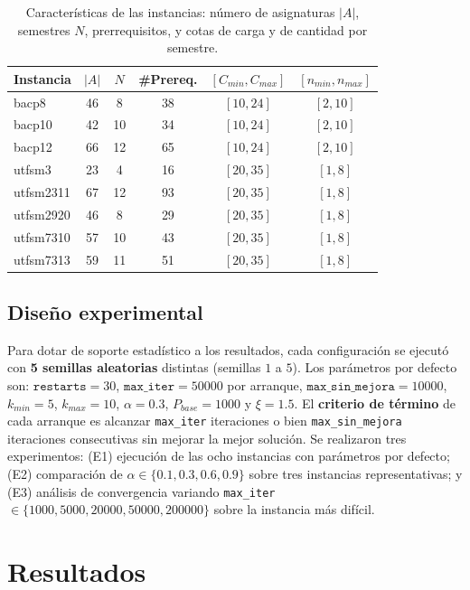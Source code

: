 \documentclass[letter, 10pt]{article}
\begin{document}
\begin{table}[h]
\centering
\begin{tabular}{lccccc}
\hline
Instancia & $|A|$ & $N$ & \#Prereq. & $[C_{min},C_{max}]$ & $[n_{min},n_{max}]$ \\
\hline
bacp8     & 46 & 8  & 38 & $[10,24]$ & $[2,10]$ \\
bacp10    & 42 & 10 & 34 & $[10,24]$ & $[2,10]$ \\
bacp12    & 66 & 12 & 65 & $[10,24]$ & $[2,10]$ \\
utfsm3    & 23 & 4  & 16 & $[20,35]$ & $[1,8]$  \\
utfsm2311 & 67 & 12 & 93 & $[20,35]$ & $[1,8]$  \\
utfsm2920 & 46 & 8  & 29 & $[20,35]$ & $[1,8]$  \\
utfsm7310 & 57 & 10 & 43 & $[20,35]$ & $[1,8]$  \\
utfsm7313 & 59 & 11 & 51 & $[20,35]$ & $[1,8]$  \\
\hline
\end{tabular}
\caption{Caracter\'isticas de las instancias: n\'umero de asignaturas $|A|$, semestres $N$, prerrequisitos, y cotas de carga y de cantidad por semestre.}
\label{tab:inst}
\end{table}

\subsection{Dise\~no experimental}
Para dotar de soporte estad\'istico a los resultados, cada configuraci\'on se ejecut\'o con \textbf{5 semillas aleatorias} distintas (semillas $1$ a $5$). Los par\'ametros por defecto son: $\texttt{restarts}=30$, $\texttt{max\_iter}=50000$ por arranque, $\texttt{max\_sin\_mejora}=10000$, $k_{min}=5$, $k_{max}=10$, $\alpha=0.3$, $P_{base}=1000$ y $\xi=1.5$. El \textbf{criterio de t\'ermino} de cada arranque es alcanzar \texttt{max\_iter} iteraciones o bien \texttt{max\_sin\_mejora} iteraciones consecutivas sin mejorar la mejor soluci\'on. Se realizaron tres experimentos: (E1) ejecuci\'on de las ocho instancias con par\'ametros por defecto; (E2) comparaci\'on de $\alpha \in \{0.1, 0.3, 0.6, 0.9\}$ sobre tres instancias representativas; y (E3) an\'alisis de convergencia variando \texttt{max\_iter} $\in \{1000,5000,20000,50000,200000\}$ sobre la instancia m\'as dif\'icil.

\section{Resultados}
\end{document}
